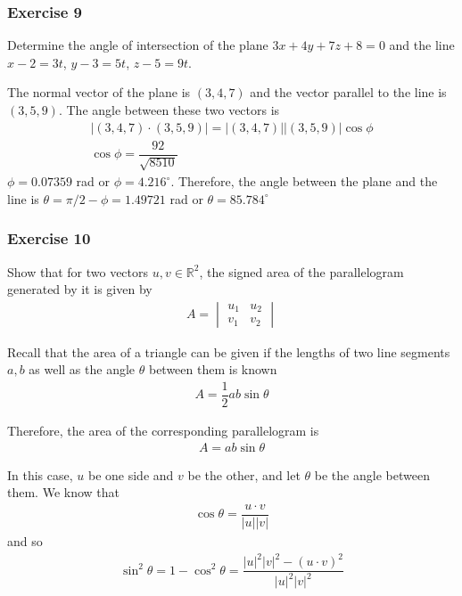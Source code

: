 \documentclass{article}
\newcommand{\R}{\mathbb{R}}
\begin{document}
	\subsubsection*{Exercise 9}
	Determine the angle of intersection of the plane $3x + 4y + 7z + 8 = 0$
	and the line $x - 2 = 3t$, $y - 3 = 5t$, $z - 5 = 9t$.
	
	The normal vector of the plane is $(3, 4, 7)$ and the vector parallel to the line is $(3, 5, 9)$. The angle between these two vectors is
	\begin{gather*}
		|(3, 4, 7) \cdot (3, 5, 9)| = |(3, 4, 7)| |(3, 5, 9)| \cos \phi \\
		\cos \phi = \dfrac{92}{\sqrt{8510}}
	\end{gather*}
	$\phi = 0.07359$ rad or $\phi = 4.216^\circ$. Therefore, the angle between the plane and the line is $\theta = \pi/2 - \phi = 1.49721$ rad or $\theta = 85.784^\circ$
	
	\subsubsection*{Exercise 10}
	Show that for two vectors $u, v \in \R^2$, the signed area of the parallelogram generated by it is given by
	\begin{gather*}
		A = \begin{vmatrix}
			u_1 & u_2 \\
			v_1 & v_2
		\end{vmatrix}
	\end{gather*}
	
	Recall that the area of a triangle can be given if the lengths of two line segments $a, b$ as well as the angle $\theta$ between them is known
	\begin{gather*}
		A = \dfrac{1}{2} ab \sin \theta
	\end{gather*}
	
	Therefore, the area of the corresponding parallelogram is
	\begin{gather*}
		A = ab \sin \theta
	\end{gather*}
	
	In this case, $u$ be one side and $v$ be the other, and let $\theta$ be the angle between them. We know that
	\begin{gather*}
		\cos \theta = \dfrac{u \cdot v}{|u||v|}
	\end{gather*}
	and so
	\begin{gather*}
		\sin^2 \theta = 1 - \cos^2 \theta = \dfrac{|u|^2|v|^2 - (u \cdot v)^2}{|u|^2|v|^2}
	\end{gather*}
	
\end{document}
